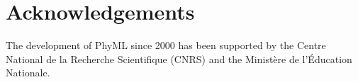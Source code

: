 \documentclass[a4paper,12pt]{article}
\begin{document}
\section{Acknowledgements}  
The development of PhyML since 2000 has been supported by the Centre National de la Recherche
Scientifique (CNRS) and the Minist\`ere de l'\'Education Nationale.

% 



\printindex
\end{document}
